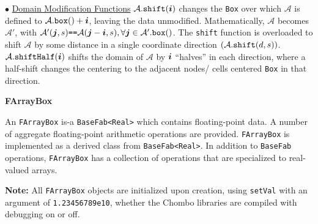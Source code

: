 \begin{trivlist}
\item $\bullet$ \underline{Domain Modification Functions}  
${\mathcal{A}}.{\tt{shift}}({\boldsymbol{i}})$ changes
the {\tt{Box}} over which ${\mathcal{A}}$ is defined 
to ${\mathcal{A}}.{\tt{box}}() + {\boldsymbol{i}}$,
leaving the data unmodified.  Mathematically, 
${\mathcal{A}}$ becomes ${\mathcal{A}}'$,
with ${\mathcal{A}}'({\boldsymbol{j}}, s) \mbox{{\tt{==}}} {\mathcal{A}}({\boldsymbol{j}}
- {\boldsymbol{i}}, s), \forall {\boldsymbol{j}} \in
{\mathcal{A}}'.{\tt{box}}()$.  The {\tt{shift}} function is overloaded to
shift ${\mathcal{A}}$ by some distance in a single coordinate direction
$({\mathcal{A}}.{\tt{shift}}(d, s))$.  
${\mathcal{A}}.{\tt{shiftHalf}}({\boldsymbol{i}})$ shifts the
domain of ${\mathcal{A}}$ by ${\boldsymbol{i}}$ 
``halves'' in each direction, where a
half-shift changes the centering to the adjacent nodes/ cells centered
{\tt{Box}} in that direction.

\end{trivlist}

\noindent
{\bf FArrayBox}

An \verb|FArrayBox| is-a \verb|BaseFab<Real>| which contains
floating-point data.  A number of
aggregate floating-point arithmetic operations are provided.
\verb|FArrayBox| is implemented as a derived class from
\verb|BaseFab<Real>|.  In addition to {\tt{BaseFab}} operations,
{\tt{FArrayBox}} has a collection of operations that are specialized
to real-valued arrays.

{\bf{Note:}}  All \verb|FArrayBox| objects are initialized upon creation,
using {\tt{setVal}} with an argument of {\tt{1.23456789e10}},
whether the Chombo libraries are compiled with debugging on or off.

